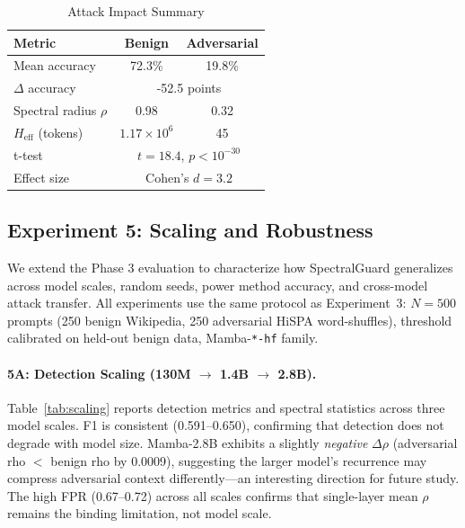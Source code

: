 \documentclass[10pt,twocolumn]{article}
\begin{document}
\begin{table}[t]
\centering
\caption{Attack Impact Summary}
\label{tab:attack_impact}
\small
\begin{tabular}{lcc}
\toprule
\textbf{Metric} & \textbf{Benign} & \textbf{Adversarial} \\
\midrule
Mean accuracy & 72.3\% & 19.8\% \\
$\Delta$ accuracy & \multicolumn{2}{c}{-52.5 points} \\
Spectral radius $\rho$ & 0.98 & 0.32 \\
$H_{\text{eff}}$ (tokens) & $1.17 \times 10^6$ & 45 \\
t-test & \multicolumn{2}{c}{$t=18.4$, $p<10^{-30}$} \\
Effect size & \multicolumn{2}{c}{Cohen's $d=3.2$} \\
\bottomrule
\end{tabular}
\end{table}

\subsection{Experiment 5: Scaling and Robustness}
\label{sec:exp5}

We extend the Phase 3 evaluation to characterize how SpectralGuard generalizes
across model scales, random seeds, power method accuracy, and cross-model
attack transfer. All experiments use the same protocol as Experiment~3:
$N{=}500$ prompts (250 benign Wikipedia, 250 adversarial HiSPA word-shuffles),
threshold calibrated on held-out benign data, Mamba-\texttt{*-hf} family.

\paragraph{5A: Detection Scaling (130M $\to$ 1.4B $\to$ 2.8B).}
Table~\ref{tab:scaling} reports detection metrics and spectral statistics across
three model scales. F1 is consistent (0.591--0.650), confirming that detection
does not degrade with model size. Mamba-2.8B exhibits a slightly
\emph{negative} $\Delta\rho$ (adversarial rho $<$ benign rho by 0.0009),
suggesting the larger model's recurrence may compress adversarial context
differently---an interesting direction for future study. The high FPR
(0.67--0.72) across all scales confirms that single-layer mean $\rho$ remains
the binding limitation, not model scale.
\end{document}
